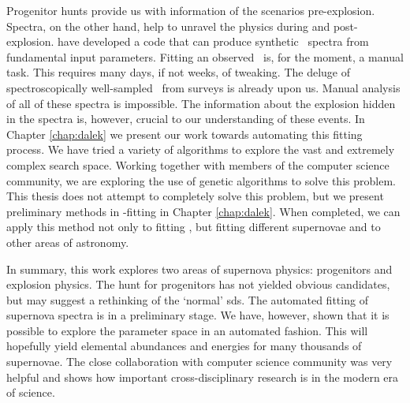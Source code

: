 Progenitor hunts provide us with information of the scenarios pre-explosion. Spectra, on the other hand, help to unravel the physics during and post-explosion. \cite{2008MNRAS.386.1897M} have developed a code that can produce synthetic \snia\ spectra from fundamental input parameters. Fitting an observed \snia\ is, for the moment, a manual task. This requires many days, if not weeks, of tweaking. The deluge of spectroscopically well-sampled \sneia\ from surveys is already upon us. Manual analysis of all of these spectra is impossible. The information about the explosion hidden in the spectra is, however, crucial to our understanding of these events. In Chapter \ref{chap:dalek} we present our work towards automating this fitting process. We have tried a variety of algorithms to explore the vast and extremely complex search space. Working together with members of the computer science community, we are exploring the use of genetic algorithms to solve this problem. This thesis does not attempt to completely solve this problem, but we present preliminary methods in \snia-fitting in Chapter \ref{chap:dalek}. When completed, we can apply this method not only to fitting \snia, but fitting different supernovae and to other areas of astronomy. 

In summary, this work explores two areas of supernova physics: progenitors and explosion physics. The hunt for progenitors has not yielded obvious candidates, but may suggest a rethinking of the `normal' \gls{sds}. The automated fitting of supernova spectra is in a preliminary stage. We have, however, shown that it is possible to explore the parameter space in an automated fashion. This will hopefully yield elemental abundances and energies for many thousands of supernovae. The close collaboration with computer science community was very helpful and shows how important cross-disciplinary research is in the modern era of science. 



